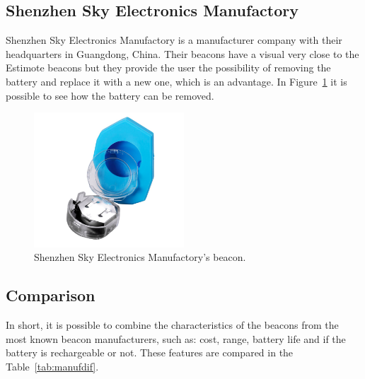 \subsection{Shenzhen Sky Electronics Manufactory} 
\label{subsection:shenzhen}
Shenzhen Sky Electronics Manufactory is a manufacturer company with their headquarters in Guangdong, China. 
Their beacons have a visual very close to the Estimote beacons but they provide the user the possibility of removing the battery and replace it with a new one, which is an advantage. In Figure~\ref{fig:shenbeacon} it is possible to see how the battery can be removed.

\begin{figure}[!htb]
  \centering
  \includegraphics[width=0.5\textwidth]{Figures/shen_data.png}
  \caption[Shenzhen Sky Electronics Manufactory's beacon]{Shenzhen Sky Electronics Manufactory's beacon.}
  \label{fig:shenbeacon}
\end{figure}


\subsection{Comparison} 
\label{subsection:comparison1}

In short, it is possible to combine the characteristics of the beacons from the most known beacon manufacturers, such as: cost, range, battery life and if the battery is rechargeable or not. These features are compared in the Table~\ref{tab:manufdif}. 

